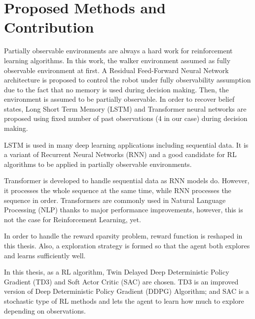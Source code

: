 \section{Proposed Methods and Contribution}
\label{sec:proposed_methods}

Partially observable environments are always a hard work for reinforcement learning algorithms. 
In this work, the walker environment assumed as fully observable environment at first. 
A Residual Feed-Forward Neural Network architecture is proposed to control 
the robot under fully observability assumption due to the fact that no memory is used during decision making. 
Then, the environment is assumed to be partially observable. 
In order to recover belief states, Long Short Term Memory (LSTM) and 
Transformer neural networks are proposed using fixed number of 
past observations (4 in our case) during decision making. 

LSTM is used in many deep learning applications including sequential data. 
It is a variant of Recurrent Neural Networks (RNN) and a good candidate for RL algorithms to be applied in partially observable environments. 

Transformer is developed to handle sequential data as RNN models do. 
However, it processes the whole sequence at the same time, while RNN processes the sequence in order. 
Transformers are commonly used in Natural Language Processing (NLP) thanks to major performance improvements, however, this is not the case for Reinforcement Learning, yet.

In order to handle the reward sparsity problem, reward function is reshaped in this thesis. Also, a exploration strategy is formed so that the agent both explores and learns sufficiently well. 

In this thesis, as a RL algorithm, Twin Delayed Deep Deterministic Policy Gradient (TD3) and Soft Actor Critic (SAC) are chosen. TD3 is an improved version of Deep Deterministic Policy Gradient (DDPG) Algorithm; and SAC is a stochastic type of RL methods and lets the agent to learn how much to explore depending on observations.
